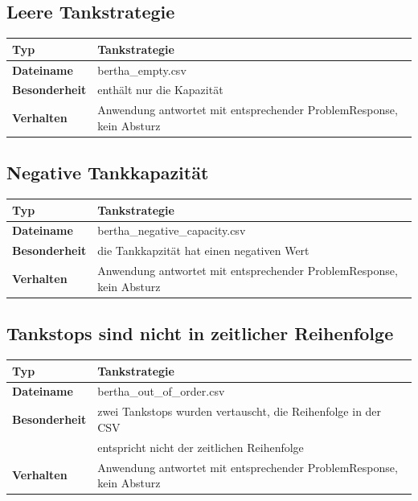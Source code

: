 \documentclass[
ngerman          %
,a4paper          %
,11pt
,pdftex
]{report}
\begin{document}
\subsection{Leere Tankstrategie}

\begin{table}[H]
	\centering
	\begin{tabular}{l l}
		\textbf{Typ} & \textbf{Tankstrategie} \\ 
		\hline
		\hline
		\textbf{Dateiname} & bertha\_empty.csv \\
        \textbf{Besonderheit} & enthält nur die Kapazität \\
        \textbf{Verhalten} & Anwendung antwortet mit entsprechender ProblemResponse, kein Absturz \\
		\hline 
	\end{tabular}
\end{table} 

\subsection{Negative Tankkapazität}

\begin{table}[H]
	\centering
	\begin{tabular}{l l}
		\textbf{Typ} & \textbf{Tankstrategie} \\
		\hline
		\hline 
		\textbf{Dateiname} & bertha\_negative\_capacity.csv \\
        \textbf{Besonderheit} & die Tankkapzität hat einen negativen Wert \\
        \textbf{Verhalten} & Anwendung antwortet mit entsprechender ProblemResponse, kein Absturz \\
		\hline 
	\end{tabular}
\end{table} 

\subsection{Tankstops sind nicht in zeitlicher Reihenfolge}

\begin{table}[H]
	\centering
	\begin{tabular}{l l}
		\textbf{Typ} & \textbf{Tankstrategie} \\
		\hline
		\hline
		\textbf{Dateiname} & bertha\_out\_of\_order.csv \\
        \textbf{Besonderheit} & zwei Tankstops wurden vertauscht, die Reihenfolge in der CSV \\
        & entspricht nicht der zeitlichen Reihenfolge \\
        \textbf{Verhalten} & Anwendung antwortet mit entsprechender ProblemResponse, kein Absturz \\
		\hline 
	\end{tabular}
\end{table} 
\end{document}
